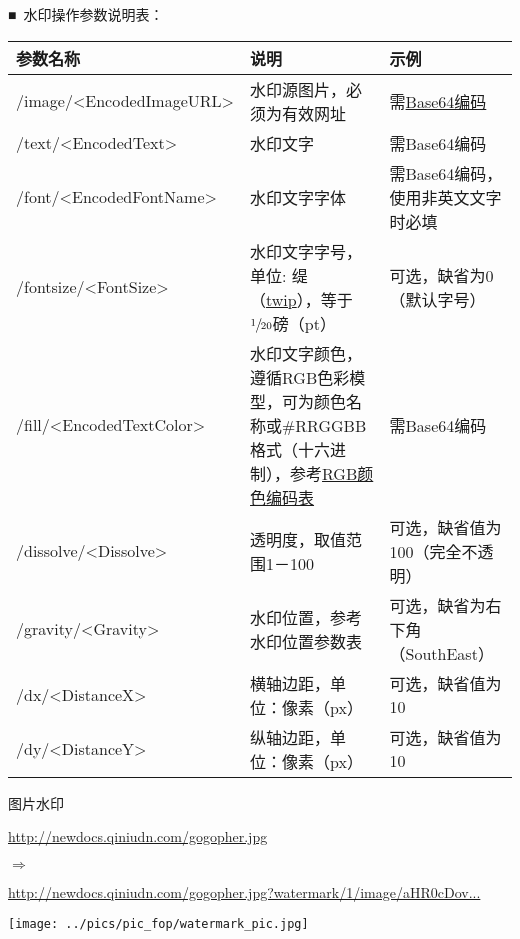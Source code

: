 \documentclass[11pt, oneside]{book}
\newcommand{\qsym}[1]{
\footnotesize
\noindent
#1\par
\normalsize
}
\newcommand{\qpara}[1]{
\vspace{0.3em}
\noindent
#1\par
\vspace{0.3em}
}
\newcommand{\qsamplelink}[1]{
\vspace{0.2em}
\noindent
#1\par
\vspace{0.1em}
}
\newcommand{\qurl}[1]{\footnotesize\url{#1}\normalsize}
\newcommand{\qtable}[1]{\footnotesize\vspace{0.5em}#1\vspace{0.5em}\normalsize}
\begin{document}
\qpara{■\ 水印操作参数说明表：}
\qtable{
\begin{tabular}[t]{|l|p{14em}|p{10em}|}
\hline
参数名称 & 说明 & 示例 \\
\hline
/image/\textless EncodedImageURL\textgreater & 水印源图片，必须为有效网址 & 需\href{http://zh.wikipedia.org/zh-cn/Base64}{Base64编码} \\
\hline
/text/\textless EncodedText\textgreater & 水印文字 & 需Base64编码 \\
\hline
/font/\textless EncodedFontName\textgreater & 水印文字字体 & 需Base64编码，使用非英文文字时必填 \\
\hline
/fontsize/\textless FontSize\textgreater & 水印文字字号，单位: 缇（\href{http://en.wikipedia.org/wiki/Twip}{twip}），等于$\sfrac{1}{20}$磅（pt） & 可选，缺省为0（默认字号） \\
\hline
/fill/\textless EncodedTextColor\textgreater & 水印文字颜色，遵循RGB色彩模型，可为颜色名称或\#RRGGBB格式（十六进制），参考\href{http://www.rapidtables.com/web/color/RGB_Color.htm}{RGB颜色编码表} & 需Base64编码 \\
\hline
/dissolve/\textless Dissolve\textgreater & 透明度，取值范围1－100 & 可选，缺省值为100（完全不透明） \\
\hline
/gravity/\textless Gravity\textgreater & 水印位置，参考水印位置参数表 & 可选，缺省为右下角（SouthEast） \\
\hline
/dx/\textless DistanceX\textgreater & 横轴边距，单位：像素（px） & 可选，缺省值为10 \\
\hline
/dy/\textless DistanceY\textgreater & 纵轴边距，单位：像素（px） & 可选，缺省值为10 \\
\hline
\end{tabular}
}

\begin{sample}
  \caption{图片水印}
    \qsamplelink{\qurl{http://newdocs.qiniudn.com/gogopher.jpg}}
    \qsym{$\Rightarrow$}
    \qsamplelink{\ttfamily\footnotesize\href{http://newdocs.qiniudn.com/gogopher.jpg?watermark/1/image/aHR0cDovL3d3dy5iMS5xaW5pdWRuLmNvbS9pbWFnZXMvbG9nby0yLnBuZw==}{http://newdocs.qiniudn.com/gogopher.jpg?watermark/1/image/aHR0cDov...}\normalsize}

    \begin{center}
      \texttt{[image: ../pics/pic\_fop/watermark\_pic.jpg]}
    \end{center}
\end{sample}
\end{document}
